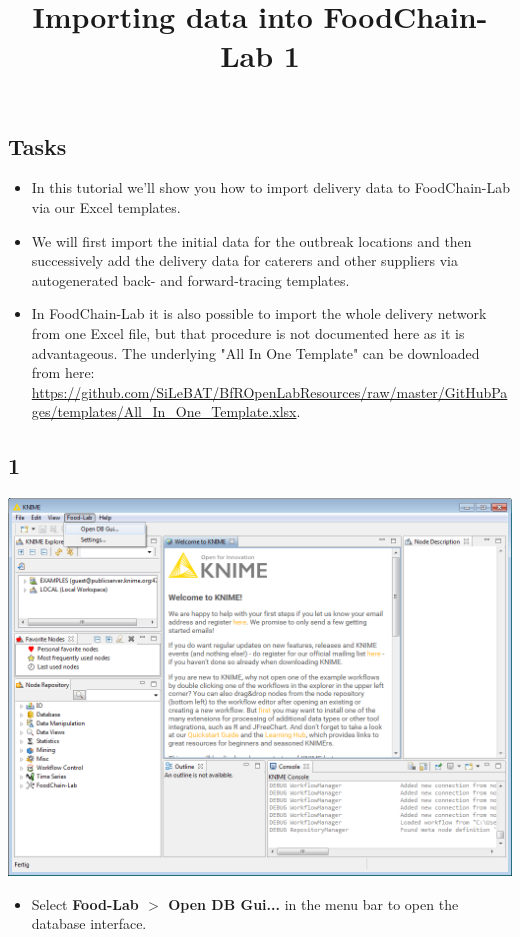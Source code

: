 \documentclass{beamer}
\title{Importing data into FoodChain-Lab 1}
\date{}
\begin{document}
\maketitle

\section{ }

\subsection{Tasks}
\begin{frame}
	\begin{itemize}
		\item In this tutorial we'll show you how to import delivery data to FoodChain-Lab via our Excel templates.
		\item We will first import the initial data for the outbreak locations and then successively add the delivery data for caterers and other suppliers via autogenerated back- and forward-tracing templates.
		\item In FoodChain-Lab it is also possible to import the whole delivery network from one Excel file, but that procedure is not documented here as it is advantageous. The underlying "All In One Template" can be downloaded from here: \url{https://github.com/SiLeBAT/BfROpenLabResources/raw/master/GitHubPages/templates/All_In_One_Template.xlsx}.
	\end{itemize}
\end{frame}
 
\subsection{1}
\begin{frame}
	\begin{center}
  		\includegraphics[height=0.6\textheight]{1.png}
	\end{center}
	\begin{itemize}
		\item Select \textbf{Food-Lab $>$ Open DB Gui...} in the menu bar to open the database interface.
	\end{itemize}
\end{frame}
\end{document}
